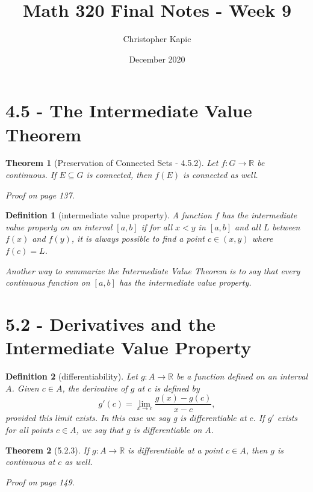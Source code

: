 \documentclass{article}
\title{Math 320 Final Notes - Week 9}
\author{Christopher Kapic}
\date{December 2020}
\newtheorem{definition}{Definition}
\newtheorem{theorem}{Theorem}
\begin{document}
\maketitle

\section*{4.5 - The Intermediate Value Theorem}
\begin{theorem}[Preservation of Connected Sets - 4.5.2]
    Let $f:G\rightarrow \mathbb{R}$ be continuous. If $E \subseteq G$ is connected, then $f(E)$ is connected as well.

    Proof on page 137.
\end{theorem}

\begin{definition}[intermediate value property]
    A function $f$ has the \textit{intermediate value property} on an interval $[a,b]$ if for all $x < y$ in $[a,b]$ and all $L$ between $f(x)$ and $f(y)$, it is always possible to find a point $c \in (x,y)$ where $f(c) = L$.

    Another way to summarize the Intermediate Value Theorem is to say that every continuous function on $[a,b]$ has the intermediate value property.
\end{definition}

\section*{5.2 - Derivatives and the Intermediate Value Property}
\begin{definition}[differentiability]
    Let $g : A\rightarrow \mathbb{R}$ be a function defined on an interval $A$. Given $c \in A$, the \textit{derivative} of $g$ at $c$ is defined by \[g'(c)=\lim _{x \rightarrow c} \frac{g(x)-g(c)}{x-c},\] provided this limit exists. In this case we say \textit{g is differentiable at} $c$. If $g'$ exists for all points $c \in A$, we say that $g$ is \textit{differentiable} on $A$.
\end{definition}

\begin{theorem}[5.2.3]
    If $g:A\rightarrow\mathbb{R}$ is differentiable at a point $c \in A$, then $g$ is continuous at $c$ as well.

    Proof on page 149.
\end{theorem}
\end{document}
